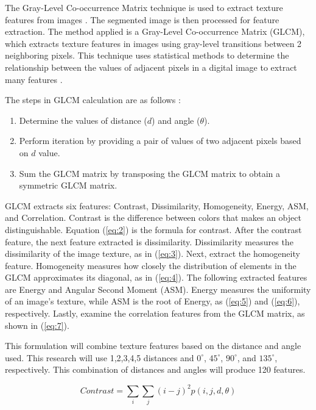 \documentclass[10pt,a4paper]{article}
\begin{document}
The Gray-Level Co-occurrence Matrix technique is used to extract texture features from images \cite{Utaminingrum2022}. The segmented image is then processed for feature extraction. The method applied is a Gray-Level Co-occurrence Matrix (GLCM), which extracts texture features in images using gray-level transitions between 2 neighboring pixels. This technique uses statistical methods to determine the relationship between the values of adjacent pixels in a digital image to extract many features \cite{Utaminingrum2023,Priyanka2020}. 

The steps in GLCM calculation are as follows \cite{Utaminingrum2023}:

\begin{enumerate}
    \item Determine the values of distance ($d$) and angle ($\theta$).
    \item Perform iteration by providing a pair of values of two adjacent pixels based on $d$ value.
    \item Sum the GLCM matrix by transposing the GLCM matrix to obtain a symmetric GLCM matrix.
\end{enumerate}

GLCM extracts six features: Contrast, Dissimilarity, Homogeneity, Energy, ASM, and Correlation. Contrast is the difference between colors that makes an object distinguishable. Equation (\ref{eq:2}) is the formula for contrast. After the contrast feature, the next feature extracted is dissimilarity. Dissimilarity measures the dissimilarity of the image texture, as in (\ref{eq:3}). Next, extract the homogeneity feature. Homogeneity measures how closely the distribution of elements in the GLCM approximates its diagonal, as in (\ref{eq:4}). The following extracted features are Energy and Angular Second Moment (ASM). Energy measures the uniformity of an image's texture, while ASM is the root of Energy, as (\ref{eq:5}) and (\ref{eq:6}), respectively. Lastly, examine the correlation features from the GLCM matrix, as shown in (\ref{eq:7}).

This formulation will combine texture features based on the distance and angle used. This research will use 1,2,3,4,5 distances and $0^\circ$, $45^\circ$, $90^\circ$, and $135^\circ$, respectively. This combination of distances and angles will produce 120 features.

\begin{equation} \label{eq:2}
Contrast=\sum_{i}\sum_{j}(i-j)^2 p(i,j,d,\theta)
\end{equation}
\end{document}
